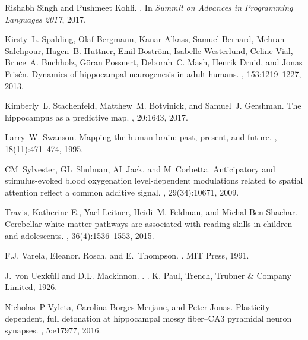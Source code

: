 \documentclass[letterpaper,11pt]{article}
\begin{document}
\begin{thebibliography}{100}
Rishabh Singh and Pushmeet Kohli.
.
\newblock In {\em Summit on Advances in Programming Languages 2017}, 2017.

Kirsty~L. Spalding, Olaf Bergmann, Kanar Alkass, Samuel Bernard, Mehran
  Salehpour, Hagen~B. Huttner, Emil Bostr\"{o}m, Isabelle Westerlund, Celine
  Vial, Bruce~A. Buchholz, G\"{o}ran Possnert, Deborah~C. Mash, Henrik Druid,
  and Jonas Fris\'{e}n.
\newblock Dynamics of hippocampal neurogenesis in adult humans.
, 153:1219--1227, 2013.

Kimberly~L. Stachenfeld, Matthew~M. Botvinick, and Samuel~J. Gershman.
\newblock The hippocampus as a predictive map.
, 20:1643, 2017.

Larry~W. Swanson.
\newblock Mapping the human brain: past, present, and future.
, 18(11):471--474, 1995.

CM~Sylvester, GL~Shulman, AI~Jack, and M~Corbetta.
\newblock Anticipatory and stimulus-evoked blood oxygenation level-dependent
  modulations related to spatial attention reflect a common additive signal.
, 29(34):10671, 2009.

Travis, Katherine E., Yael Leitner, Heidi~M. Feldman, and Michal Ben-Shachar.
\newblock Cerebellar white matter pathways are associated with reading skills
  in children and adolescents.
, 36(4):1536--1553, 2015.

F.J. Varela, Eleanor. Rosch, and E.~Thompson.
.
\newblock MIT Press, 1991.

J.~von Uexk\"{u}ll and D.L. Mackinnon.
.
. K. Paul, Trench, Trubner \& Company Limited, 1926.

Nicholas~P Vyleta, Carolina Borges-Merjane, and Peter Jonas.
\newblock Plasticity-dependent, full detonation at hippocampal mossy
  fiber–{CA3} pyramidal neuron synapses.
, 5:e17977, 2016.


\end{thebibliography}
\end{document}
